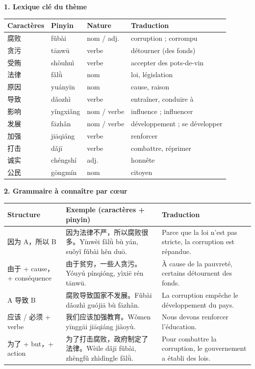 \documentclass[11pt]{article}
\begin{document}
\begin{bilan}
\textbf{1. Lexique clé du thème}\par
\begin{center}
\begin{tabularx}{\linewidth}{|X|X|X|X|}
\hline
\rowcolor{popblueL} Caractères & Pinyin & Nature & Traduction \\
\hline
腐败 & fǔbài & nom / adj. & corruption ; corrompu \\
\hline
贪污 & tānwū & verbe & détourner (des fonds) \\
\hline
受贿 & shòuhuì & verbe & accepter des pots-de-vin \\
\hline
法律 & fǎlǜ & nom & loi, législation \\
\hline
原因 & yuányīn & nom & cause, raison \\
\hline
导致 & dǎozhì & verbe & entraîner, conduire à \\
\hline
影响 & yǐngxiǎng & nom / verbe & influence ; influencer \\
\hline
发展 & fāzhǎn & nom / verbe & développement ; se développer \\
\hline
加强 & jiāqiáng & verbe & renforcer \\
\hline
打击 & dǎjī & verbe & combattre, réprimer \\
\hline
诚实 & chéngshí & adj. & honnête \\
\hline
公民 & gōngmín & nom & citoyen \\
\hline
\end{tabularx}
\end{center}

\textbf{2. Grammaire à connaître par cœur}\par
\begin{center}
\begin{tabularx}{\linewidth}{|X|X|X|}
\hline
\rowcolor{popblueL} Structure & Exemple (caractères + pinyin) & Traduction \\
\hline
因为 A，所以 B & 因为法律不严，所以腐败很多。Yīnwèi fǎlǜ bù yán, suǒyǐ fǔbài hěn duō. & Parce que la loi n'est pas stricte, la corruption est répandue. \\
\hline
由于 + cause，+ conséquence & 由于贫穷，一些人贪污。Yóuyú pínqióng, yìxiē rén tānwū. & À cause de la pauvreté, certains détournent des fonds. \\
\hline
A 导致 B & 腐败导致国家不发展。Fǔbài dǎozhì guójiā bù fāzhǎn. & La corruption empêche le développement du pays. \\
\hline
应该 / 必须 + verbe & 我们应该加强教育。Wǒmen yīnggāi jiāqiáng jiàoyù. & Nous devons renforcer l'éducation. \\
\hline
为了 + but，+ action & 为了打击腐败，政府制定了法律。Wèile dǎjī fǔbài, zhèngfǔ zhìdìngle fǎlǜ. & Pour combattre la corruption, le gouvernement a établi des lois. \\
\hline
\end{tabularx}
\end{center}


\end{bilan}
\end{document}
